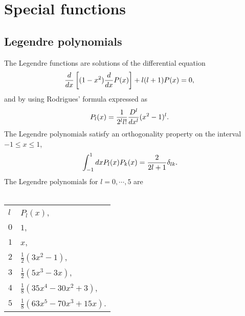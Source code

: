 \chapter{Special functions}
\section{Legendre polynomials}
\label{app:leg}
The Legendre functions are solutions of the differential equation 
\begin{align}
	&	{d \over dx} \left[ (1-x^2) {d \over dx} P(x) \right]+l(l+1)P(x) = 0,
		\label{eq:legdiff}
\end{align}
and by using Rodrigues' formula expressed as
\begin{align}
		&	P_l(x) = {1 \over2^l l!}{D^l \over dx^l}(x^2-1)^l.
		\label{eq:soluleg}
\end{align}
The Legendre polynomials satisfy an orthogonality property on the interval\\ $-1\leq x \leq 1$,
\begin{align}
		&\int^{1}_{-1}dxP_l(x)P_k(x)=\frac{2}{2l+1}\delta_{lk}.\notag
\end{align}
The Legendre polynomials for $l=0,\cdots, 5$ are\\
\\
		\begin{tabular}{ll}
$l$ &$	P_l(x)$,\\
$0$ &$	1$, \\
$1$ &$	x$, \\
$2$ &$	\frac{1}{2}(3x^2-1)$, \\
$3$ &$	\frac{1}{2} (5x^3-3x)$, \\
$4$ &$	\frac18 (35x^4-30x^2+3)$,\\
$5$ &$	\frac18 (63x^5-70x^3+15x)$.
\end{tabular}

